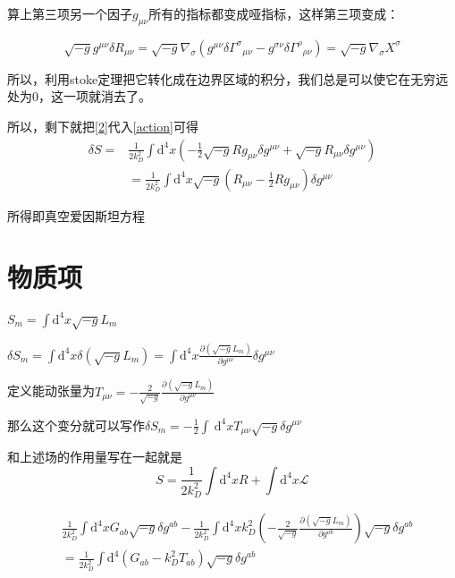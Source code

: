 \documentclass[UTF8]{article}
\newcommand{\dd}{\mathrm{d}}
\begin{document}
算上第三项另一个因子$ g_{\mu\nu} $所有的指标都变成哑指标，这样第三项变成：

\begin{equation}
	\sqrt{-g}g^{\mu\nu}\delta R_{\mu\nu}=\sqrt{-g}\nabla_{\sigma}(g^{\mu\nu}\delta{\Gamma^\sigma}_{\mu\nu}-g^{\sigma\nu}\delta{\Gamma^\rho}_{\rho\nu})=\sqrt{-g}\nabla_{\sigma}X^\sigma\label{deltaRmunu}
\end{equation}

所以，利用stoke定理把它转化成在边界区域的积分，我们总是可以使它在无穷远处为0，这一项就消去了。


所以，剩下就把\eqref{2}代入\eqref{action}可得
\begin{align}
	\delta S=&\frac{1}{2k_D^2}\int\dd^4x(-\frac{1}{2}\sqrt{-g}Rg_{\mu\nu}\delta g^{\mu\nu}+\sqrt{-g}R_{\mu\nu}\delta g^{\mu\nu})\\
	&=\frac{1}{2k_D^2}\int\dd^4x\sqrt{-g}(R_{\mu\nu}-\frac{1}{2}Rg_{\mu\nu})\delta g^{\mu\nu}
\end{align}

所得即真空爱因斯坦方程
\section{物质项}
	
	$S_{m}=\int \mathrm{d}^{4} x \sqrt{-g} L_{m} $

$ \delta S_{m}=\int \mathrm{d}^{4} x \delta\left(\sqrt{-g} L_{m}\right)=\int \mathrm{d}^{4} x\frac{\partial\left(\sqrt{-g} L_{m}\right)}{\partial g^{\mu \nu}} \delta g^{\mu \nu}$

定义能动张量为$ T_{\mu \nu}=-\frac{2}{\sqrt{-g}} \frac{\partial\left(\sqrt{-g} L_{m}\right)}{\partial g^{\mu \nu}} $

那么这个变分就可以写作$ \delta S_{m}=-\frac{1}{2} \int \mathrm{~d}^{4} x T_{\mu \nu} \sqrt{-g} \delta g^{\mu \nu} $

	和上述场的作用量写在一起就是
	\begin{equation}\label{key}
		S=\frac{1}{2k_D^2}\int\dd ^4 xR+\int\dd^4x\mathcal{L}
	\end{equation}
	
	
	\begin{align}
			&\frac{1}{2k_D^2}\int \dd^{4} xG_{ab}\sqrt{-g}\delta g^{ab}-\frac{1}{2k_D^2}\int\dd ^4 xk_D^2
			\left(
			-\frac{2}{\sqrt{-g}} \frac{\partial\left(\sqrt{-g} L_{m}\right)}{\partial g^{ab}}
			\right) \sqrt{-g} \delta g^{ab}\\
		&=\frac{1}{2k_D^2}\int \dd^{4}\left(G_{ab}-k_D^2T_{ab}\right)\sqrt{-g} \delta g^{ab}
	\end{align}
	
\end{document}
